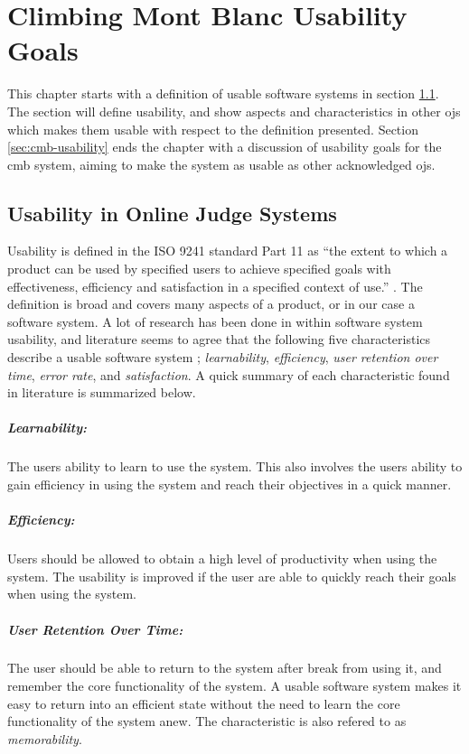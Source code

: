 \chapter{Climbing Mont Blanc Usability Goals}
This chapter starts with a definition of usable software systems in section \ref{sec:usability-def}. The section will define usability, and show aspects and characteristics in other \glspl{oj} which makes them usable with respect to the definition presented. Section \ref{sec:cmb-usability} ends the chapter with a discussion of usability goals for the \gls{cmb} system, aiming to make the system as usable as other acknowledged \glspl{oj}.

\section{Usability in Online Judge Systems}
\label{sec:usability-def}
Usability is defined in the ISO 9241 standard Part 11 as ``the extent to which a product can be used by specified users to achieve specified goals with effectiveness, efficiency and satisfaction in a specified context of use.'' \cite{ISO1998}. The definition is broad and covers many aspects of a product, or in our case a software system. A lot of research has been done in within software system usability, and literature seems to agree that the following five characteristics describe a usable software system \cite{holzinger2005, ferre2001}; \textit{learnability}, \textit{efficiency}, \textit{user retention over time}, \textit{error rate}, and \textit{satisfaction}. A quick summary of each characteristic found in literature is summarized below.

\paragraph*{Learnability:} The users ability to learn to use the system. This also involves the users ability to gain efficiency in using the system and reach their objectives in a quick manner.

\paragraph*{Efficiency:} Users should be allowed to obtain a high level of productivity when using the system. The usability is improved if the user are able to quickly reach their goals when using the system.

\paragraph*{User Retention Over Time:} The user should be able to return to the system after break from using it, and remember the core functionality of the system. A usable software system makes it easy to return into an efficient state without the need to learn the core functionality of the system anew. The characteristic is also refered to as \textit{memorability}.

